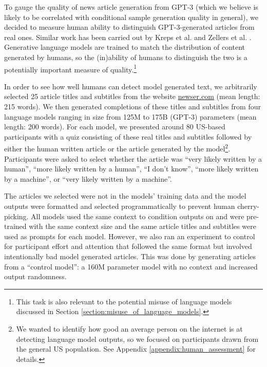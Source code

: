 \documentclass{article}
\begin{document}
To gauge the quality of news article generation from GPT-3 (which we believe is likely to be correlated with conditional sample generation quality in general), we decided to measure human ability to distinguish GPT-3-generated articles from real ones. Similar work has been carried out by Kreps et al. \cite{kreps-all-the-news} and Zellers et al. \cite{zellers2019defending}. Generative language models are trained to match the distribution of content generated by humans, so the (in)ability of humans to distinguish the two is a potentially important measure of quality.\footnote{This task is also relevant to the potential misuse of language models discussed in Section \ref{section:misuse_of_language_models}.} 

In order to see how well humans can detect model generated text, we arbitrarily selected 25 article titles and subtitles from the website \href{newser.com}{newser.com} (mean length: 215 words). We then generated completions of these titles and subtitles from four language models ranging in size from 125M to 175B (GPT-3) parameters (mean length: 200 words). For each model, we presented around 80 US-based participants with a quiz consisting of these real titles and subtitles followed by either the human written article or the article generated by the model\footnote{We wanted to identify how good an average person on the internet is at detecting language model outputs, so we focused on participants drawn from the general US population. See Appendix \ref{appendix:human_assessment} for details.}. Participants were asked to select whether the article was ``very likely written by a human'', ``more likely written by a human'', ``I don't know'', ``more likely written by a machine'', or ``very likely written by a machine''.

The articles we selected were not in the models’ training data and the model outputs were formatted and selected programmatically to prevent human cherry-picking. All models used the same context to condition outputs on and were pre-trained with the same context size and the same article titles and subtitles were used as prompts for each model. However, we also ran an experiment to control for participant effort and attention that followed the same format but involved intentionally bad model generated articles. This was done by generating articles from a ``control model'': a 160M parameter model with no context and increased output randomness.
\end{document}
